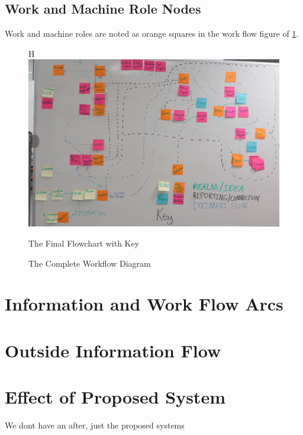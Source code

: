 \documentclass[12pt]{article} %
\begin{document}
\begin{samepage}
\section{Work and Machine Role Nodes} %
\nopagebreak
Work and machine roles are noted as orange squares in the work flow figure of \ref{fig:Workflow_final}.
  \begin{figure}{H}
    \centering
    \includegraphics[width=0.95\linewidth]{flow/flowchart_final}
    \caption{The Final Flowchart with Key}
    \label{fig:flowchart_final_large}
    \caption{The Complete Workflow Diagram}
    \label{fig:Workflow_final}
  \end{figure}
\end{samepage}

\section{Information and Work Flow Arcs} %

\section{Outside Information Flow} %


\section{Effect of Proposed System} %
We dont have an after, just the proposed systems
\end{document}
